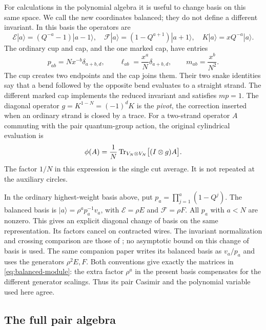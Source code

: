 For calculations in the polynomial algebra it is useful to change basis on this same space. We call the new coordinates balanced; they do not define a different invariant. In this basis the operators are
\begin{equation}\label{eq:balanced-module}
 \mathcal E|a\rangle=(Q^{-a}-1)|a-1\rangle,\quad
 \mathcal F|a\rangle=(1-Q^{a+1})|a+1\rangle,\quad
 K|a\rangle=xQ^{-a}|a\rangle.
\end{equation}
The ordinary cup and cap, and the one marked cap, have entries
\begin{equation}\label{eq:cups}
 p_{ab}=Nx^{-b}\delta_{a+b,d},\qquad
 \ell_{ab}=\frac{x^a}{N}\delta_{a+b,d},\qquad
 m_{ab}=\frac{x^b}{N^2}.
\end{equation}
The cup creates two endpoints and the cap joins them. Their two snake identities say that a bend followed by the opposite bend evaluates to a straight strand. The different marked cap implements the reduced invariant and satisfies $mp=1$. The diagonal operator $g=K^{1-N}=(-1)^dK$ is the \emph{pivot}, the correction inserted when an ordinary strand is closed by a trace. For a two-strand operator $A$ commuting with the pair quantum-group action, the original cylindrical evaluation is
\begin{equation}\label{eq:phi-physical}
 \phi(A)=\frac1N\operatorname{Tr}_{V_N\otimes V_N}\bigl[(I\otimes g)A\bigr].
\end{equation}
The factor $1/N$ in this expression is the single cut average. It is not repeated at the auxiliary circles.


In the ordinary highest-weight basis above, put
$p_a=\prod_{j=1}^a(1-Q^j)$. The balanced basis is
$|a\rangle=\rho^a p_a^{-1}v_a$, with
$\mathcal E=\rho E$ and $\mathcal F=\rho F$.
All $p_a$ with $a<N$ are nonzero. This gives an explicit diagonal
change of basis on the same representation. Its factors cancel on
contracted wires. The invariant normalization and crossing comparison
are those of \cite[Theorem~10.1]{Finite}; no asymptotic bound on this
change of basis is used.
The same companion paper writes its balanced basis as $v_a/p_a$ and
uses the generators $\rho^2E,F$. Both conventions give exactly the
matrices in \eqref{eq:balanced-module}: the extra factor $\rho^a$ in
the present basis compensates for the different generator scalings.
Thus its pair Casimir and the polynomial variable used here agree.

\subsection{The full pair algebra}

